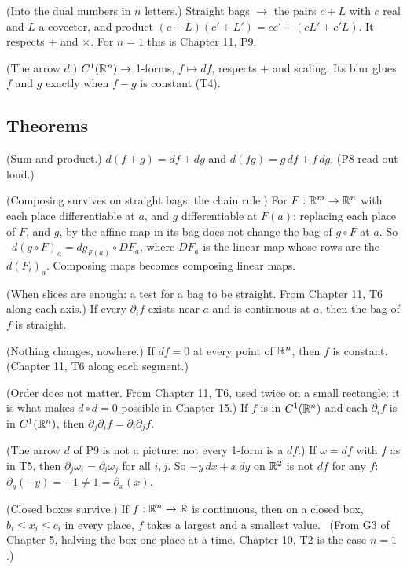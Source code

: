 \begin{lines}
\item[\lab{P8}] (Into the dual numbers in $n$ letters.) Straight bags $\to$ the pairs $c + L$ with $c$ real and $L$ a covector, and product $(c + L)(c' + L') = cc' + (c L' + c' L)$. It respects $+$ and $\times$. For $n = 1$ this is Chapter 11, P9.
\item[\lab{P9}] (The arrow $d$.) $C^1(\mathbb{R}^n) \to$ 1-forms, $f \mapsto df$, respects $+$ and scaling. Its blur glues $f$ and $g$ exactly when $f - g$ is constant (T4).
\end{lines}

\subsection*{Theorems}

\begin{lines}
\item[\lab{T1}] (Sum and product.) $d(f + g) = df + dg$ and $d(fg) = g\,df + f\,dg$. (P8 read out loud.)
\item[\lab{T2}] (Composing survives on straight bags; the chain rule.) For $F : \mathbb{R}^m \to \mathbb{R}^n$ with each place differentiable at $a$, and $g$ differentiable at $F(a)$: replacing each place of $F$, and $g$, by the affine map in its bag does not change the bag of $g \circ F$ at $a$. So \ $d(g \circ F)_a = dg_{F(a)} \circ DF_a$, where $DF_a$ is the linear map whose rows are the $d(F_i)_a$. Composing maps becomes composing linear maps.
\item[\lab{T3}] (When slices are enough: a test for a bag to be straight. From Chapter 11, T6 along each axis.) If every $\partial_i f$ exists near $a$ and is continuous at $a$, then the bag of $f$ is straight.
\item[\lab{T4}] (Nothing changes, nowhere.) If $df = 0$ at every point of $\mathbb{R}^n$, then $f$ is constant. (Chapter 11, T6 along each segment.)
\item[\lab{T5}] (Order does not matter. From Chapter 11, T6, used twice on a small rectangle; it is what makes $d \circ d = 0$ possible in Chapter 15.) If $f$ is in $C^1(\mathbb{R}^n)$ and each $\partial_i f$ is in $C^1(\mathbb{R}^n)$, then $\partial_j \partial_i f = \partial_i \partial_j f$.
\item[\lab{T6}] (The arrow $d$ of P9 is not a picture: not every 1-form is a $df$.) If $\omega = df$ with $f$ as in T5, then $\partial_j \omega_i = \partial_i \omega_j$ for all $i, j$. So $-y\,dx + x\,dy$ on $\mathbb{R}^2$ is not $df$ for any $f$: $\partial_y(-y) = -1 \neq 1 = \partial_x(x)$.
\item[\lab{T7}] (Closed boxes survive.) If $f : \mathbb{R}^n \to \mathbb{R}$ is continuous, then on a closed box, $b_i \le x_i \le c_i$ in every place, $f$ takes a largest and a smallest value. \ (From G3 of Chapter 5, halving the box one place at a time. Chapter 10, T2 is the case $n = 1$.)
\end{lines}

